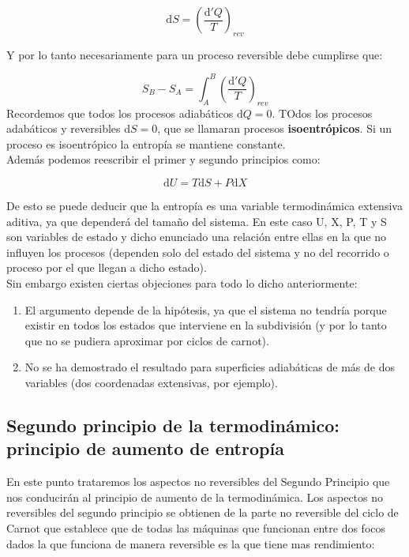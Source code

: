 \documentclass[12pt,a4paper]{article}
\newcommand{\D}{\mathrm{d}}
\newcommand{\parentesis}[1]{\left( #1 \right)}
\begin{document}
\begin{equation} 
\D S = \parentesis{\dfrac{\D ' Q}{T}}_{rev}   
\end{equation}

Y por lo tanto necesariamente para un proceso reversible debe cumplirse que:

\begin{equation}
S_B - S_A = \int_A^B \left( \dfrac{\D ' Q}{T} \right) _{rev}
\end{equation}
Recordemos que todos los procesos adiabáticos $\D Q=0$. TOdos los procesos adabáticos y reversibles $\D S = 0$, que se llamaran procesos \textbf{isoentrópicos}. Si un proceso es isoentrópico la entropía se mantiene constante. \\

Además podemos reescribir el primer y segundo principios como:

\begin{equation}
\D U = T \D S + P \D X
\end{equation}

De esto se puede deducir que la entropía es una variable termodinámica extensiva aditiva, ya que dependerá del tamaño del sistema. En este caso U, X, P, T y S son variables de estado y dicho enunciado una relación entre ellas en la que no influyen los procesos (dependen solo del estado del sistema y no del recorrido o proceso por el que llegan a dicho estado).  \\


Sin embargo existen ciertas objeciones para todo lo dicho anteriormente:

\begin{enumerate}
\item El argumento depende de la hipótesis, ya que el sistema no tendría porque existir en todos los estados que interviene en la subdivisión (y por lo  tanto que no se pudiera aproximar por ciclos de carnot).

\item No se ha demostrado el resultado para superficies adiabáticas de más de dos variables (dos coordenadas extensivas, por ejemplo). \\
\end{enumerate}

\subsection{Segundo principio de la termodinámico: principio de aumento de entropía}

En este punto trataremos los aspectos no reversibles del Segundo Principio que nos conducirán al principio de aumento de la termodinámica. Los aspectos no reversibles del segundo principio se obtienen de la parte no reversible del ciclo de Carnot que establece que de todas las máquinas que funcionan entre dos focos dados la que funciona de manera reversible es la que tiene mas rendimiento:
\end{document}
